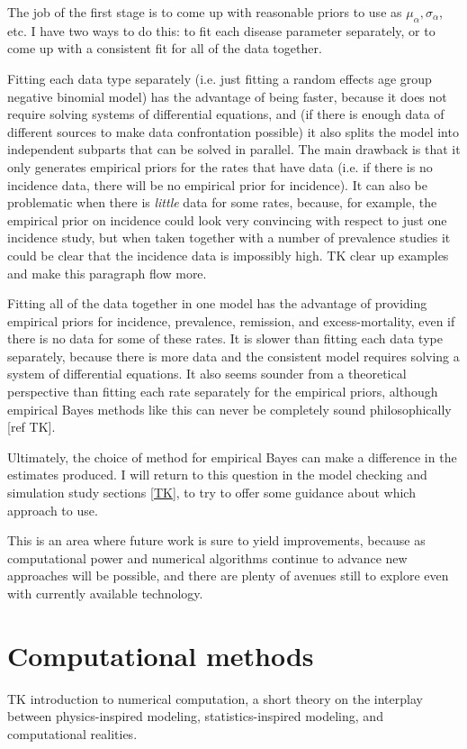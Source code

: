 The job of the first stage is to come up with reasonable priors to use
as $\mu_\alpha, \sigma_\alpha$, etc.  I have two ways to do this: to fit
each disease parameter separately, or to come up with a consistent fit
for all of the data together.

Fitting each data type separately (i.e. just fitting a random effects
age group negative binomial model) has the advantage of being faster,
because it does not require solving systems of differential equations,
and (if there is enough data of different sources to make data
confrontation possible) it also splits the model into independent
subparts that can be solved in parallel.  The main drawback is that it
only generates empirical priors for the rates that have data (i.e. if
there is no incidence data, there will be no empirical prior for
incidence).  It can also be problematic when there is \emph{little}
data for some rates, because, for example, the empirical prior on
incidence could look very convincing with respect to just one
incidence study, but when taken together with a number of prevalence
studies it could be clear that the incidence data is impossibly high.
TK clear up examples and make this paragraph flow more.

Fitting all of the data together in one model has the advantage of
providing empirical priors for incidence, prevalence, remission, and
excess-mortality, even if there is no data for some of these rates.
It is slower than fitting each data type separately, because there is
more data and the consistent model requires solving a system of
differential equations.  It also seems sounder from a theoretical
perspective than fitting each rate separately for the empirical
priors, although empirical Bayes methods like this can never be
completely sound philosophically [ref TK].

Ultimately, the choice of method for empirical Bayes can make a
difference in the estimates produced.  I will return to this question
in the model checking and simulation study sections \ref{TK}, to try
to offer some guidance about which approach to use.

This is an area where future work is sure to yield improvements,
because as computational power and numerical algorithms continue to
advance new approaches will be possible, and there are plenty of
avenues still to explore even with currently available technology.


\section{Computational methods}
TK introduction to numerical computation, a short theory on the
interplay between physics-inspired modeling, statistics-inspired
modeling, and computational realities.

